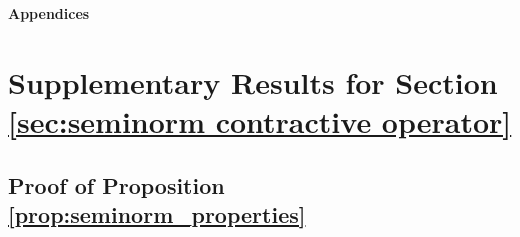 \documentclass[11 pt]{article}
\begin{document}
	
	
	
	\newpage
	
	\begin{center}
		{\LARGE\bfseries Appendices}
	\end{center}
	
	\appendix
	
	\section{Supplementary Results for Section  \ref{sec:seminorm contractive operator}}
	\subsection{Proof of Proposition \ref{prop:seminorm_properties}}\label{pf:prop:seminorm_properties}
\end{document}
